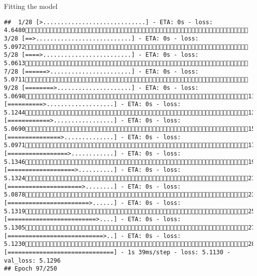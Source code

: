 \documentclass[
  ignorenonframetext,
]{beamer}
\begin{document}
\begin{frame}[fragile]{Fitting the model}
\begin{verbatim}
##  1/28 [>.............................] - ETA: 0s - loss: 4.6480 3/28 [==>...........................] - ETA: 0s - loss: 5.0972 5/28 [====>.........................] - ETA: 0s - loss: 5.0613 7/28 [======>.......................] - ETA: 0s - loss: 5.0711 9/28 [========>.....................] - ETA: 0s - loss: 5.069811/28 [==========>...................] - ETA: 0s - loss: 5.124413/28 [============>.................] - ETA: 0s - loss: 5.069015/28 [===============>..............] - ETA: 0s - loss: 5.097117/28 [=================>............] - ETA: 0s - loss: 5.134619/28 [===================>..........] - ETA: 0s - loss: 5.132421/28 [=====================>........] - ETA: 0s - loss: 5.087823/28 [=======================>......] - ETA: 0s - loss: 5.131925/28 [=========================>....] - ETA: 0s - loss: 5.130527/28 [===========================>..] - ETA: 0s - loss: 5.123028/28 [==============================] - 1s 39ms/step - loss: 5.1130 - val_loss: 5.1296
## Epoch 97/250

\end{verbatim}
\end{frame}
\end{document}
